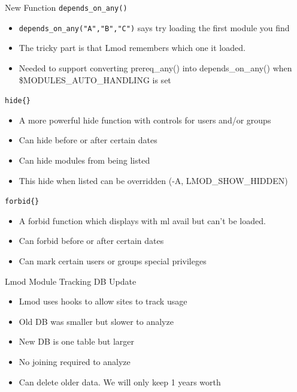 \documentclass{beamer}
\begin{document}
\begin{frame}{New Function \texttt{depends\_on\_any()}}
  \begin{itemize}
    \item \texttt{depends\_on\_any("A","B","C")} says try loading the
      first module you find
    \item The tricky part is that Lmod remembers which one it loaded.
    \item Needed to support converting prereq\_any() into
      depends\_on\_any() when \$MODULES\_AUTO\_HANDLING is set
  \end{itemize}
\end{frame}

\begin{frame}{\texttt{hide\{\}}}
  \begin{itemize}
    \item A more powerful hide function with controls for users and/or
      groups
    \item Can hide before or after certain dates
    \item Can hide modules from being listed
    \item This hide when listed can be overridden (-A, LMOD\_SHOW\_HIDDEN)
  \end{itemize}
\end{frame}

\begin{frame}{\texttt{forbid\{\}}}
  \begin{itemize}
    \item A forbid function which displays with ml avail but can't be loaded.
    \item Can forbid before or after certain dates
    \item Can mark certain users or groups special privileges
  \end{itemize}
\end{frame}

\begin{frame}{Lmod Module Tracking DB Update }
  \begin{itemize}
    \item Lmod uses hooks to allow sites to track usage
    \item Old DB was smaller but slower to analyze
    \item New DB is one table but larger
    \item No joining required to analyze
    \item Can delete older data. We will only keep 1 years worth
  \end{itemize}
\end{frame}
\end{document}
